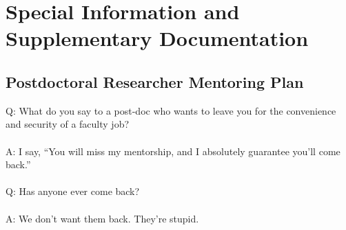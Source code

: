 \section*{Special Information and Supplementary Documentation}

\subsection*{Postdoctoral Researcher Mentoring Plan}

Q: What do you say to a post-doc who wants to leave you for the convenience and security of a faculty job?
~\\~\\
\noindent A: I say, ``You will miss my mentorship, and I absolutely guarantee you'll come back.''
~\\~\\
\noindent Q: Has anyone ever come back?
~\\~\\
\noindent A: We don't want them back. They're stupid.